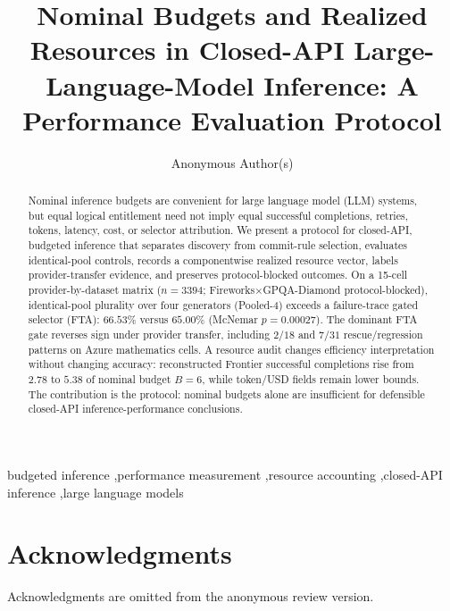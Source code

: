 \documentclass[preprint,12pt]{elsarticle}
\begin{document}
\begin{frontmatter}

\title{Nominal Budgets and Realized Resources in Closed-API Large-Language-Model Inference: A Performance Evaluation Protocol}

\author{Anonymous Author(s)}
\address{Anonymous Institution}

\begin{abstract}
Nominal inference budgets are convenient for large language model (LLM) systems, but equal logical
entitlement need not imply equal successful completions, retries, tokens, latency, cost, or selector
attribution. We present a protocol for closed-API, budgeted inference that separates discovery from
commit-rule selection, evaluates identical-pool controls, records a componentwise realized resource
vector, labels provider-transfer evidence, and preserves protocol-blocked outcomes. On a 15-cell
provider-by-dataset matrix ($n{=}3394$; Fireworks$\times$GPQA-Diamond protocol-blocked),
identical-pool plurality over four generators (Pooled-4) exceeds a failure-trace gated selector
(FTA): $66.53\%$ versus $65.00\%$ (McNemar $p{=}0.00027$). The dominant FTA gate reverses sign under
provider transfer, including $2/18$ and $7/31$ rescue/regression patterns on Azure mathematics
cells. A resource audit changes efficiency interpretation without changing accuracy: reconstructed
Frontier successful completions rise from $2.78$ to $5.38$ of nominal budget $B{=}6$, while token/USD
fields remain lower bounds. The contribution is the protocol: nominal budgets alone are insufficient
for defensible closed-API inference-performance conclusions.
\end{abstract}

\begin{keyword}
budgeted inference \sep performance measurement \sep resource accounting \sep closed-API inference \sep large language models
\end{keyword}

\end{frontmatter}















\section*{Acknowledgments}
Acknowledgments are omitted from the anonymous review version.
\end{document}
